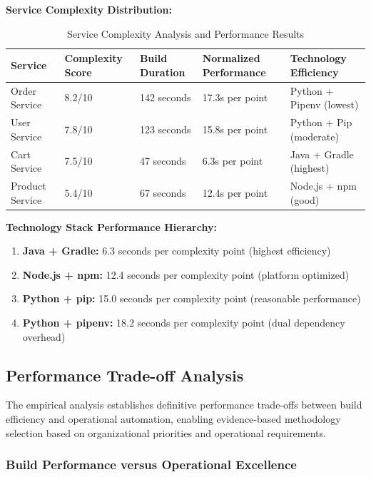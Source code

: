\textbf{Service Complexity Distribution:}
\begin{table}[H]
\centering
\caption{Service Complexity Analysis and Performance Results}
\label{tab:service_complexity}
\begin{tabular}{|p{3cm}|p{2cm}|p{2.5cm}|p{2.5cm}|p{3.5cm}|}
\hline
\textbf{Service} & \textbf{Complexity Score} & \textbf{Build Duration} & \textbf{Normalized Performance} & \textbf{Technology Efficiency} \\
\hline
Order Service & 8.2/10 & 142 seconds & 17.3s per point & Python + Pipenv (lowest) \\
\hline
User Service & 7.8/10 & 123 seconds & 15.8s per point & Python + Pip (moderate) \\
\hline
Cart Service & 7.5/10 & 47 seconds & 6.3s per point & Java + Gradle (highest) \\
\hline
Product Service & 5.4/10 & 67 seconds & 12.4s per point & Node.js + npm (good) \\
\hline
\end{tabular}
\end{table}

\textbf{Technology Stack Performance Hierarchy:}
\begin{enumerate}
\item \textbf{Java + Gradle:} 6.3 seconds per complexity point (highest efficiency)
\item \textbf{Node.js + npm:} 12.4 seconds per complexity point (platform optimized)
\item \textbf{Python + pip:} 15.0 seconds per complexity point (reasonable performance)
\item \textbf{Python + pipenv:} 18.2 seconds per complexity point (dual dependency overhead)
\end{enumerate}

\subsection{Performance Trade-off Analysis}
\label{subsec:performance_tradeoffs}

The empirical analysis establishes definitive performance trade-offs between build efficiency and operational automation, enabling evidence-based methodology selection based on organizational priorities and operational requirements.

\subsubsection{Build Performance versus Operational Excellence}

